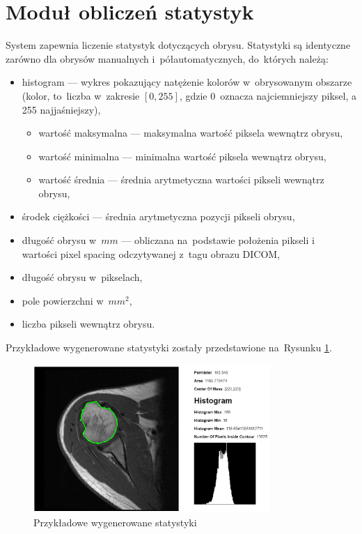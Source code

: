 \documentclass[a4paper,11pt,twoside,openright]{report}
\theoremstyle{definition}
\begin{document}
\section {Moduł obliczeń statystyk}

System zapewnia liczenie statystyk dotyczących obrysu. Statystyki są identyczne
zarówno dla obrysów manualnych i~półautomatycznych, do~których należą:

\begin{itemize}[noitemsep]
\item histogram --- wykres pokazujący natężenie kolorów w~obrysowanym obszarze
(kolor, to~liczba w~zakresie $[0,255]$, gdzie 0~oznacza najciemniejszy piksel,
a 255 najjaśniejszy),
\begin{itemize}[noitemsep]
\item wartość maksymalna --- maksymalna wartość piksela wewnątrz obrysu,
\item wartość minimalna --- minimalna wartość piksela wewnątrz obrysu,
\item wartość średnia --- średnia arytmetyczna wartości pikseli wewnątrz obrysu,
\end{itemize}
\item środek ciężkości --- średnia arytmetyczna pozycji pikseli obrysu,
\item długość obrysu w~$mm$ --- obliczana na~podstawie położenia pikseli i~%
wartości pixel spacing odczytywanej z~tagu obrazu DICOM,
\item długość obrysu w~pikselach,
\item pole powierzchni w~$mm^2$,
\item liczba pikseli wewnątrz obrysu.
\end{itemize}

Przykładowe wygenerowane statystyki zostały przedstawione na~Rysunku \ref{fig:107b}.

\begin{figure}[h!]
	\center
	\includegraphics[width=0.8\textwidth]{107}
	\caption{Przykładowe wygenerowane statystyki}
    	\label{fig:107b}
\end{figure}
\end{document}

